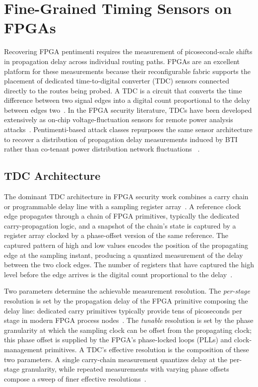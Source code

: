 \section{Fine-Grained Timing Sensors on FPGAs}
\label{sec:bg-tdc}

Recovering FPGA pentimenti requires the measurement of picosecond-scale
shifts in propagation delay across individual routing paths. FPGAs are
an excellent platform for these measurements because their
reconfigurable fabric supports the placement of dedicated
time-to-digital converter (TDC) sensors connected directly to the routes
being probed. A TDC is a circuit that converts the time difference
between two signal edges into a digital count proportional to the delay
between edges two~\cite{henzler2010time}. In the FPGA security
literature, TDCs have been developed extensively as on-chip
voltage-fluctuation sensors for remote power analysis
attacks~\cite{schellenberg2018remote, zhao2018fpga, gnad2017voltage,
	gnad2016analysis}. Pentimenti-based attack classes repurposes the same
sensor architecture to recover a distribution of propagation delay
measurements induced by BTI rather than co-tenant power distribution
network fluctuations ~\cite{drewes2024pentimento}.

\subsection{TDC Architecture}

The dominant TDC architecture in FPGA security work combines a carry
chain or programmable delay line with a sampling register
array~\cite{gnad2016analysis, schellenberg2018remote, zhao2018fpga,
	gnad2017voltage}. A reference clock edge propagates through a chain of
FPGA primitives, typically the dedicated carry-propagation logic, and a
snapshot of the chain's state is captured by a register array clocked by
a phase-offset version of the same reference. The captured pattern of
high and low values encodes the position of the propagating edge at the
sampling instant, producing a quantized measurement of the delay between
the two clock edges. The number of registers that have captured the high
level before the edge arrives is the digital count proportional to the
delay~\cite{gnad2016analysis, henzler2010time}.

Two parameters determine the achievable measurement resolution. The
\emph{per-stage} resolution is set by the propagation delay of the FPGA
primitive composing the delay line: dedicated carry primitives typically
provide tens of picoseconds per stage in modern FPGA process
nodes~\cite{schellenberg2018remote, drewes2024turn}. The \emph{tunable}
resolution is set by the phase granularity at which the sampling clock
can be offset from the propagating clock; this phase offset is supplied
by the FPGA's phase-locked loops (PLLs) and clock-management primitives.
A TDC's effective resolution is the composition of these two parameters.
A single carry-chain measurement quantizes delay at the per-stage
granularity, while repeated measurements with varying phase offsets
compose a sweep of finer effective
resolutions~\cite{drewes2024pentimento, drewes2024turn}.


